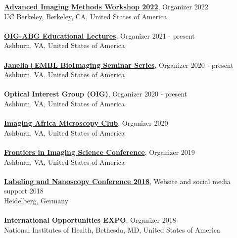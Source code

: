\documentclass[margin,line]{res}
\begin{document}
\begin{resume}
{\bf \href{https://crl.berkeley.edu/molecular-imaging-center/meetings-and-short-courses/}{Advanced Imaging Methods Workshop 2022}}, Organizer \hfill {2022}\\
UC Berkeley, Berkeley, CA, United States of America\\
\vspace*{-3mm}\\
{\bf \href{https://www.janelia.org/content/optical-interest-group}{OIG-ABG Educational Lectures}}, Organizer \hfill {2021 - present}\\
Ashburn, VA, United States of America\\
\vspace*{-3mm}\\
{\bf \href{https://www.janelia.org/node/65736}{Janelia+EMBL BioImaging Seminar Series}}, Organizer \hfill {2020 - present}\\
Ashburn, VA, United States of America\\
\vspace*{-3mm}\\
{\bf Optical Interest Group (OIG)}, Organizer \hfill {2020 - present}\\
Ashburn, VA, United States of America\\
\vspace*{-3mm}\\
{\bf \href{https://www.imagingafrica.org/}{Imaging Africa Microscopy Club}}, Organizer \hfill {2020}\\
Ashburn, VA, United States of America\\
\vspace*{-3mm}\\
{\bf \href{https://www.janelia.org/you-janelia/conferences/frontiers-in-imaging-science-ii}{ Frontiers in Imaging Science Conference}}, Organizer \hfill {2019}\\
Ashburn, VA, United States of America\\
\vspace*{-3mm}\\
{\bf \href{https://labeling-and-nanoscopy.de/}{Labeling and Nanoscopy Conference 2018}}, Website and social media support \hfill {2018}\\
Heidelberg, Germany\\
\vspace*{-3mm}\\
{\bf International Opportunities EXPO}, Organizer \hfill {2018}\\
National Institutes of Health, Bethesda, MD, United States of America\\

\end{resume}
\end{document}
